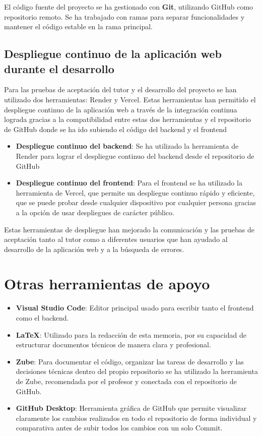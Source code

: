 El código fuente del proyecto se ha gestionado con \textbf{Git}, utilizando GitHub como repositorio remoto. Se ha trabajado con ramas para separar funcionalidades y mantener el código estable en la rama principal.

\subsection{Despliegue continuo de la aplicación web durante el desarrollo}

Para las pruebas de aceptación del tutor y el desarrollo del proyecto se han utilizado dos herramientas: Render y Vercel. Estas herramientas han permitido el despliegue continuo de la aplicación web a través de la integración continua lograda gracias a la compatibilidad entre estas dos herramientas y el repositorio de GitHub donde se ha ido subiendo el código del backend y el frontend

\begin{itemize}
  \item \textbf{Despliegue continuo del backend}: Se ha utilizado la herramienta de Render para lograr el despliegue continuo del backend desde el repositorio de GitHub
  
  \item \textbf{Despliegue continuo del frontend}: Para el frontend se ha utilizado la herramienta de Vercel, que permite un despliegue continuo rápido y eficiente, que se puede probar desde cualquier dispositivo por cualquier persona gracias a la opción de usar despliegues de carácter público.
  
\end{itemize}

Estas herramientas de despliegue han mejorado la comunicación y las pruebas de aceptación tanto al tutor como a diferentes usuarios que han ayudado al desarrollo de la aplicación web y a la búsqueda de errores.

\section{Otras herramientas de apoyo}

\begin{itemize}
  \item \textbf{Visual Studio Code}: Editor principal usado para escribir tanto el frontend como el backend.
  \item \textbf{LaTeX}: Utilizado para la redacción de esta memoria, por su capacidad de estructurar documentos técnicos de manera clara y profesional.
  \item \textbf{Zube}: Para documentar el código, organizar las tareas de desarrollo y las decisiones técnicas dentro del propio repositorio se ha utilizado la herramienta de Zube, recomendada por el profesor y conectada con el repositorio de GitHub.
  \item \textbf{GitHub Desktop}: Herramienta gráfica de GitHub que permite visualizar claramente los cambios realizados en todo el repositorio de forma individual y comparativa antes de subir todos los cambios con un solo Commit.
  
\end{itemize}

